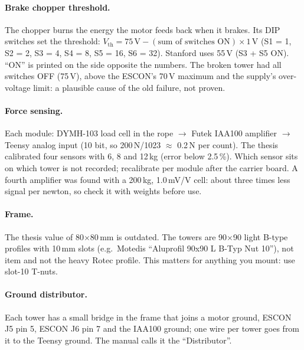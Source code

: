 \paragraph{Brake chopper threshold.} The chopper burns the energy the motor feeds back when it brakes. Its DIP
switches set the threshold: $V_\mathrm{th} = 75\,\mathrm{V} - (\text{sum of switches ON}) \times 1\,\mathrm{V}$
(S1 = 1, S2 = 2, S3 = 4, S4 = 8, S5 = 16, S6 = 32). Stanford uses 55\,V (S3 + S5 ON). ``ON'' is printed on the
side opposite the numbers. The broken tower had all switches OFF (75\,V), above the ESCON's 70\,V maximum and
the supply's over-voltage limit: a plausible cause of the old failure, not proven.

\paragraph{Force sensing.} Each module: DYMH-103 load cell in the rope $\rightarrow$ Futek IAA100 amplifier
$\rightarrow$ Teensy analog input (10 bit, so 200\,N/1023 $\approx$ 0.2\,N per count). The thesis
calibrated four sensors with 6, 8 and 12\,kg (error below 2.5\,\%). Which sensor sits on which tower is not
recorded; recalibrate per module after the carrier board. A fourth amplifier was found with a 200\,kg,
1.0\,mV/V cell: about three times less signal per newton, so check it with weights before use.

\paragraph{Frame.} The thesis value of 80$\times$80\,mm is outdated. The towers are 90$\times$90 light B-type
profiles with 10\,mm slots (e.g.\ Motedis ``Aluprofil 90x90 L B-Typ Nut 10''), not item and not the heavy
Rotec profile. This matters for anything you mount: use slot-10 T-nuts.

\paragraph{Ground distributor.} Each tower has a small bridge in the frame that joins a motor ground, ESCON J5 pin 5, ESCON
J6 pin 7 and the IAA100 ground; one wire per tower goes from it to the Teensy ground. The manual calls it the
``Distributor''.

